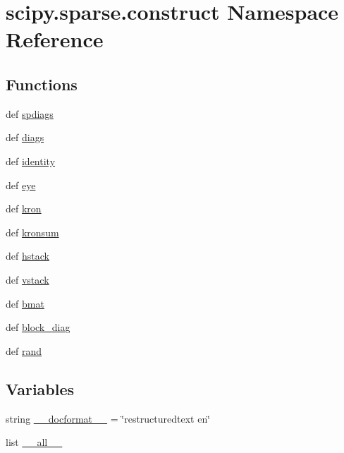 \hypertarget{namespacescipy_1_1sparse_1_1construct}{}\section{scipy.\+sparse.\+construct Namespace Reference}
\label{namespacescipy_1_1sparse_1_1construct}
\subsection*{Functions}
\begin{DoxyCompactItemize}
\item 
def \hyperlink{namespacescipy_1_1sparse_1_1construct_af3ba8d89eb6cb8d1a8b73873649d0101}{spdiags}
\item 
def \hyperlink{namespacescipy_1_1sparse_1_1construct_abc7b5e5fa6f7ae320ca90d6a1829ba75}{diags}
\item 
def \hyperlink{namespacescipy_1_1sparse_1_1construct_a46c09743ab990da449a06002d6c4ce44}{identity}
\item 
def \hyperlink{namespacescipy_1_1sparse_1_1construct_a8f8bd8bbd23456d2b64e319b9ee30825}{eye}
\item 
def \hyperlink{namespacescipy_1_1sparse_1_1construct_ac19f528243422bed4409aa82c1026dbc}{kron}
\item 
def \hyperlink{namespacescipy_1_1sparse_1_1construct_aaf190b7402f569c08348aa5921c3f589}{kronsum}
\item 
def \hyperlink{namespacescipy_1_1sparse_1_1construct_aba59863a54c7a332dedb0e252bcbe40a}{hstack}
\item 
def \hyperlink{namespacescipy_1_1sparse_1_1construct_a1278fe2b57145ac76b8d4d2a0281fc12}{vstack}
\item 
def \hyperlink{namespacescipy_1_1sparse_1_1construct_adf31ca29673da6577fff166ed444633c}{bmat}
\item 
def \hyperlink{namespacescipy_1_1sparse_1_1construct_a1e6c51dfaadde408d6cc5a23c0f37577}{block\+\_\+diag}
\item 
def \hyperlink{namespacescipy_1_1sparse_1_1construct_a3f8281838fc1684c7d30b9f55f9aba26}{rand}
\end{DoxyCompactItemize}
\subsection*{Variables}
\begin{DoxyCompactItemize}
\item 
string \hyperlink{namespacescipy_1_1sparse_1_1construct_a20c15c943f1e2d41939fde1d20c6f91c}{\+\_\+\+\_\+docformat\+\_\+\+\_\+} = \char`\"{}restructuredtext en\char`\"{}
\item 
list \hyperlink{namespacescipy_1_1sparse_1_1construct_a05ab312e8bcba96672a2b2925feffab2}{\+\_\+\+\_\+all\+\_\+\+\_\+}
\end{DoxyCompactItemize}


